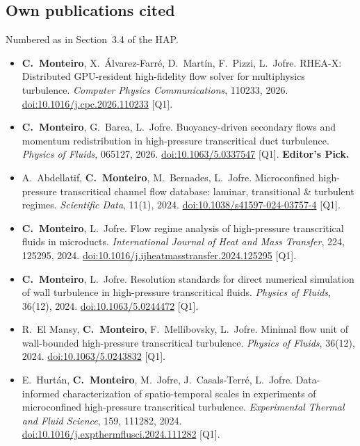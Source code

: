 \documentclass[11pt]{article}
\begin{document}
\subsection*{Own publications cited}
Numbered as in Section~3.4 of the HAP.
\begin{itemize}[leftmargin=2.6em, labelwidth=2.2em, labelsep=0.4em, itemsep=1pt]\small\sloppy
  \item[{[J1]}] \textbf{C.\ Monteiro}, X.\ \'Alvarez-Farr\'e, D.\ Mart\'in, F.\ Pizzi, L.\ Jofre. RHEA-X: Distributed GPU-resident high-fidelity flow solver for multiphysics turbulence. \emph{Computer Physics Communications}, 110233, 2026. \href{https://doi.org/10.1016/j.cpc.2026.110233}{doi:10.1016/j.cpc.2026.110233} [Q1].
  \item[{[J2]}] \textbf{C.\ Monteiro}, G.\ Barea, L.\ Jofre. Buoyancy-driven secondary flows and momentum redistribution in high-pressure transcritical duct turbulence. \emph{Physics of Fluids}, 065127, 2026. \href{https://doi.org/10.1063/5.0337547}{doi:10.1063/5.0337547} [Q1]. \textbf{Editor's Pick.}
  \item[{[J3]}] A.\ Abdellatif, \textbf{C.\ Monteiro}, M.\ Bernades, L.\ Jofre. Microconfined high-pressure transcritical channel flow database: laminar, transitional \& turbulent regimes. \emph{Scientific Data}, 11(1), 2024. \href{https://doi.org/10.1038/s41597-024-03757-4}{doi:10.1038/s41597-024-03757-4} [Q1].
  \item[{[J4]}] \textbf{C.\ Monteiro}, L.\ Jofre. Flow regime analysis of high-pressure transcritical fluids in microducts. \emph{International Journal of Heat and Mass Transfer}, 224, 125295, 2024. \href{https://doi.org/10.1016/j.ijheatmasstransfer.2024.125295}{doi:10.1016/j.ijheatmasstransfer.2024.125295} [Q1].
  \item[{[J5]}] \textbf{C.\ Monteiro}, L.\ Jofre. Resolution standards for direct numerical simulation of wall turbulence in high-pressure transcritical fluids. \emph{Physics of Fluids}, 36(12), 2024. \href{https://doi.org/10.1063/5.0244472}{doi:10.1063/5.0244472} [Q1].
  \item[{[J6]}] R.\ El Mansy, \textbf{C.\ Monteiro}, F.\ Mellibovsky, L.\ Jofre. Minimal flow unit of wall-bounded high-pressure transcritical turbulence. \emph{Physics of Fluids}, 36(12), 2024. \href{https://doi.org/10.1063/5.0243832}{doi:10.1063/5.0243832} [Q1].
  \item[{[J7]}] E.\ Hurt\'an, \textbf{C.\ Monteiro}, M.\ Jofre, J.\ Casals-Terr\'e, L.\ Jofre. Data-informed characterization of spatio-temporal scales in experiments of microconfined high-pressure transcritical turbulence. \emph{Experimental Thermal and Fluid Science}, 159, 111282, 2024. \href{https://doi.org/10.1016/j.expthermflusci.2024.111282}{doi:10.1016/j.expthermflusci.2024.111282} [Q1].

\end{itemize}
\end{document}
